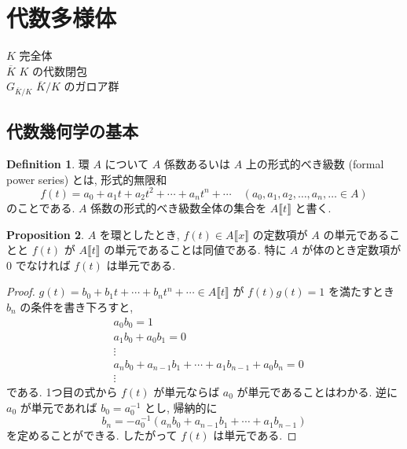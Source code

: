 \documentclass[a4paper,dvipdfmx]{jsarticle}
\theoremstyle{definition}
\newtheorem{dfn}{Definition}[section]
\newtheorem{prop}[dfn]{Proposition}
\begin{document}
\title{}
\author{
  anko
}
\maketitle

\section{代数多様体}
$K$ 完全体 \\
$\overline{K}$ $K$ の代数閉包 \\
$G_{\overline{K}/K}$ $\overline{K}/K$ のガロア群 \\
\subsection{代数幾何学の基本}
\begin{dfn}
  環 $A$ について $A$ 係数あるいは $A$ 上の形式的べき級数 (formal power series) とは, 形式的無限和
  $$
    f(t) = a_0 + a_1t + a_2t^2 + \cdots + a_nt^n + \cdots \quad (a_0,a_1,a_2,\ldots,a_n,\ldots\in A)
  $$
  のことである. $A$ 係数の形式的べき級数全体の集合を $A\llbracket t\rrbracket$ と書く.
\end{dfn}

\begin{prop}
  $A$ を環としたとき, $f(t)\in A\llbracket x\rrbracket$ の定数項が $A$ の単元であることと $f(t)$ が $A\llbracket t\rrbracket$ の単元であることは同値である. 特に $A$ が体のとき定数項が $0$ でなければ $f(t)$ は単元である.
\end{prop}
\begin{proof}
  $g(t) = b_0 + b_1t +\cdots+ b_nt^n +\cdots\in A\llbracket t\rrbracket$ が $f(t)g(t) = 1$ を満たすとき $b_n$ の条件を書き下ろすと,
  \begin{align}
     & a_0b_0                                              = 1 \\
     & a_1b_0 + a_0b_1                                     = 0 \\
     & \vdots                                                  \\
     & a_nb_0 + a_{n-1}b_1 + \cdots + a_1b_{n-1} + a_0b_n  = 0 \\
     & \vdots
  \end{align}
  である. 1つ目の式から $f(t)$ が単元ならば $a_0$ が単元であることはわかる. 逆に $a_0$ が単元であれば $b_0 = a_0^{-1}$ とし, 帰納的に
  $$
    b_n = -a_0^{-1}(a_nb_0 + a_{n-1}b_1 + \cdots + a_1b_{n-1})
  $$
  を定めることができる. したがって $f(t)$ は単元である.
\end{proof}
\end{document}
